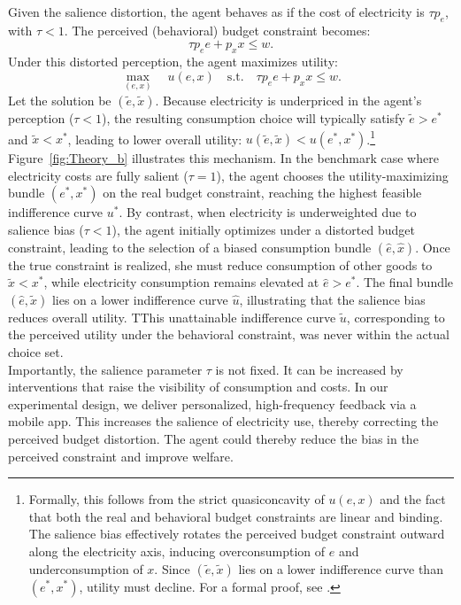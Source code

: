 Given the salience distortion, the agent behaves as if the cost of electricity is \( \tau p_e \), with \( \tau < 1 \). The perceived (behavioral) budget constraint becomes:
\[
\tau p_e e + p_x x \leq w.
\]
Under this distorted perception, the agent maximizes utility:
\[
\max_{(e, x)} \quad u(e, x) \quad \text{s.t.} \quad \tau p_e e + p_x x \leq w.
\]
Let the solution be \( (\tilde{e}, \tilde{x}) \). Because electricity is underpriced in the agent’s perception (\( \tau < 1 \)), the resulting consumption choice will typically satisfy \( \tilde{e} > e^* \) and \( \tilde{x} < x^* \), leading to lower overall utility: \( u(\tilde{e}, \tilde{x}) < u(e^*, x^*) \).\footnote{Formally, this follows from the strict quasiconcavity of \( u(e, x) \) and the fact that both the real and behavioral budget constraints are linear and binding. The salience bias effectively rotates the perceived budget constraint outward along the electricity axis, inducing overconsumption of \( e \) and underconsumption of \( x \). Since \( (\tilde{e}, \tilde{x}) \) lies on a lower indifference curve than \( (e^*, x^*) \), utility must decline. For a formal proof, see \citet[Appendix A.1]{alcocer_salience_2024}.} \\ 

Figure~\ref{fig:Theory_b} illustrates this mechanism. In the benchmark case where electricity costs are fully salient (\( \tau = 1 \)), the agent chooses the utility-maximizing bundle \( (e^*, x^*) \) on the real budget constraint, reaching the highest feasible indifference curve \( u^* \). By contrast, when electricity is underweighted due to salience bias (\( \tau < 1 \)), the agent initially optimizes under a distorted budget constraint, leading to the selection of a biased consumption bundle \( (\hat{e}, \hat{x}) \). Once the true constraint is realized, she must reduce consumption of other goods to \( \tilde{x} < x^* \), while electricity consumption remains elevated at \( \hat{e} > e^* \). The final bundle \( (\hat{e}, \tilde{x}) \) lies on a lower indifference curve \( \hat{u} \), illustrating that the salience bias reduces overall utility. TThis unattainable indifference curve \( \tilde{u} \), corresponding to the perceived utility under the behavioral constraint, was never within the actual choice set. \\


Importantly, the salience parameter \( \tau \) is not fixed. It can be increased by interventions that raise the visibility of consumption and costs. In our experimental design, we deliver personalized, high-frequency feedback via a mobile app. This increases the salience of electricity use, thereby correcting the perceived budget distortion. The agent could thereby reduce the bias in the perceived constraint and improve welfare.

